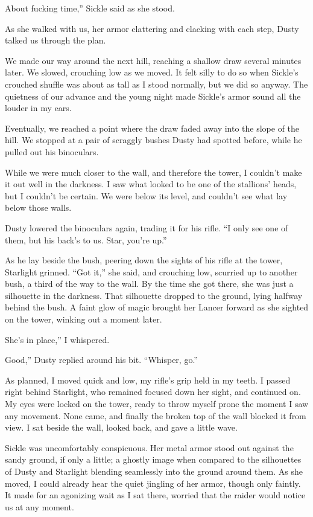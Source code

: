 \leavevmode{}About fucking time,” Sickle said as she stood.

As she walked with us, her armor clattering and clacking with each step, Dusty talked us through the plan.

We made our way around the next hill, reaching a shallow draw several minutes later. We slowed, crouching low as we moved. It felt silly to do so when Sickle’s crouched shuffle was about as tall as I stood normally, but we did so anyway. The quietness of our advance and the young night made Sickle’s armor sound all the louder in my ears.

Eventually, we reached a point where the draw faded away into the slope of the hill. We stopped at a pair of scraggly bushes Dusty had spotted before, while he pulled out his binoculars.

While we were much closer to the wall, and therefore the tower, I couldn’t make it out well in the darkness. I saw what looked to be one of the stallions’ heads, but I couldn’t be certain. We were below its level, and couldn’t see what lay below those walls.

Dusty lowered the binoculars again, trading it for his rifle. “I only see one of them, but his back’s to us. Star, you’re up.”

As he lay beside the bush, peering down the sights of his rifle at the tower, Starlight grinned. “Got it,” she said, and crouching low, scurried up to another bush, a third of the way to the wall. By the time she got there, she was just a silhouette in the darkness. That silhouette dropped to the ground, lying halfway behind the bush. A faint glow of magic brought her Lancer forward as she sighted on the tower, winking out a moment later.

\leavevmode{}She’s in place,” I whispered.

\leavevmode{}Good,” Dusty replied around his bit. “Whisper, go.”

As planned, I moved quick and low, my rifle’s grip held in my teeth. I passed right behind Starlight, who remained focused down her sight, and continued on. My eyes were locked on the tower, ready to throw myself prone the moment I saw any movement. None came, and finally the broken top of the wall blocked it from view. I sat beside the wall, looked back, and gave a little wave.

Sickle was uncomfortably conspicuous. Her metal armor stood out against the sandy ground, if only a little; a ghostly image when compared to the silhouettes of Dusty and Starlight blending seamlessly into the ground around them. As she moved, I could already hear the quiet jingling of her armor, though only faintly. It made for an agonizing wait as I sat there, worried that the raider would notice us at any moment.

